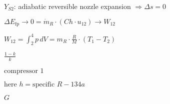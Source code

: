 \( Y_{S2} \): adiabatic reversible nozzle expansion \( \Rightarrow \Delta s = 0 \)

\( \Delta E_{\text{fp}} \to 0 = \dot{m}_{R} \cdot (Ch \cdot u_{12}) \to W_{12} \)  

\( W_{12} = \int_{2}^{4} p \, dV = m_R \cdot \frac{R}{M} \cdot (T_1 - T_2) \)  

\( \frac{1 - k}{k} \)  

\( \text{compressor 1} \)  

\( \text{here } h = \text{specific } R-134a \)  

\( G \)
